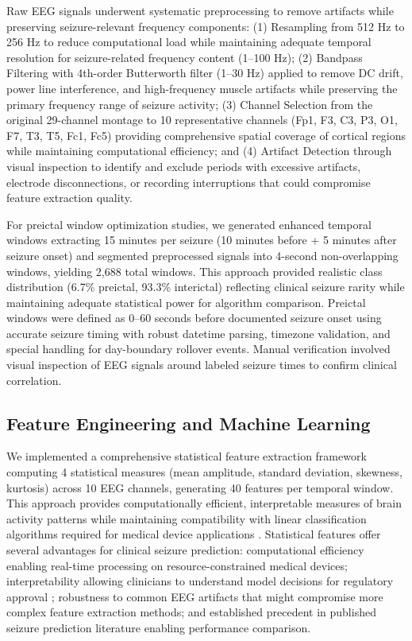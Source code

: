 \documentclass[conference]{IEEEtran}
\begin{document}
Raw EEG signals underwent systematic preprocessing to remove artifacts while preserving seizure-relevant frequency components: (1) Resampling from 512 Hz to 256 Hz to reduce computational load while maintaining adequate temporal resolution for seizure-related frequency content (1--100 Hz); (2) Bandpass Filtering with 4th-order Butterworth filter (1--30 Hz) applied to remove DC drift, power line interference, and high-frequency muscle artifacts while preserving the primary frequency range of seizure activity; (3) Channel Selection from the original 29-channel montage to 10 representative channels (Fp1, F3, C3, P3, O1, F7, T3, T5, Fc1, Fc5) providing comprehensive spatial coverage of cortical regions while maintaining computational efficiency; and (4) Artifact Detection through visual inspection to identify and exclude periods with excessive artifacts, electrode disconnections, or recording interruptions that could compromise feature extraction quality.

For preictal window optimization studies, we generated enhanced temporal windows extracting 15 minutes per seizure (10 minutes before + 5 minutes after seizure onset) and segmented preprocessed signals into 4-second non-overlapping windows, yielding 2,688 total windows. This approach provided realistic class distribution (6.7\% preictal, 93.3\% interictal) reflecting clinical seizure rarity while maintaining adequate statistical power for algorithm comparison. Preictal windows were defined as 0--60 seconds before documented seizure onset using accurate seizure timing with robust datetime parsing, timezone validation, and special handling for day-boundary rollover events. Manual verification involved visual inspection of EEG signals around labeled seizure times to confirm clinical correlation.

\subsection{Feature Engineering and Machine Learning}
We implemented a comprehensive statistical feature extraction framework computing 4 statistical measures (mean amplitude, standard deviation, skewness, kurtosis) across 10 EEG channels, generating 40 features per temporal window. This approach provides computationally efficient, interpretable measures of brain activity patterns while maintaining compatibility with linear classification algorithms required for medical device applications \cite{b16}. Statistical features offer several advantages for clinical seizure prediction: computational efficiency enabling real-time processing on resource-constrained medical devices; interpretability allowing clinicians to understand model decisions for regulatory approval \cite{b26}; robustness to common EEG artifacts that might compromise more complex feature extraction methods; and established precedent in published seizure prediction literature enabling performance comparison.
\end{document}
